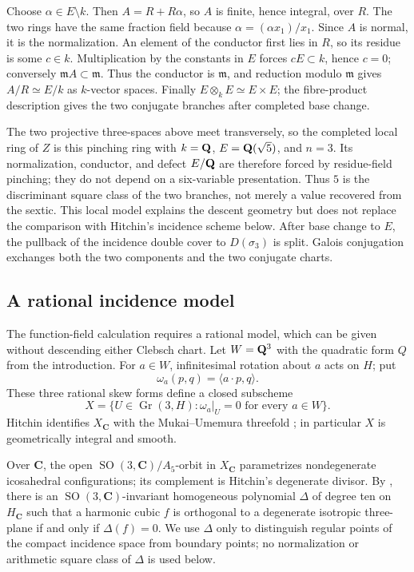 Choose \(\alpha\in E\setminus k\).  Then \(A=R+R\alpha\), so \(A\) is
finite, hence integral, over \(R\).  The two rings have the same fraction
field because \(\alpha=(\alpha x_1)/x_1\).  Since \(A\) is normal, it is
the normalization.  An element of the conductor first lies in \(R\), so its
residue is some \(c\in k\).  Multiplication by the constants in \(E\)
forces \(cE\subset k\), hence \(c=0\); conversely
\(\mathfrak m A\subset\mathfrak m\).  Thus the conductor is
\(\mathfrak m\), and reduction modulo \(\mathfrak m\) gives
\(A/R\simeq E/k\) as \(k\)-vector spaces.  Finally
\(E\otimes_kE\simeq E\times E\); the fibre-product description gives the
two conjugate branches after completed base change.

The two projective three-spaces above meet transversely, so the completed
local ring of \(Z\) is this pinching ring with \(k=\mathbf Q\),
\(E=\mathbf Q(\sqrt5)\), and \(n=3\).  Its normalization, conductor,
and defect \(E/\mathbf Q\) are therefore forced by residue-field pinching; they do
not depend on a six-variable presentation.  Thus \(5\) is the discriminant
square class of the two branches, not merely a value recovered from the
sextic.  This local model explains the descent geometry but does not replace
the comparison with Hitchin's incidence scheme below.
After base change to \(E\), the pullback of the incidence double cover to
\(D(\sigma_3)\) is split.  Galois conjugation exchanges both the two
components and the two conjugate charts.

\subsection{A rational incidence model}
\label{sec:rational-incidence-model}

The function-field calculation requires a rational model, which can be
given without descending either Clebsch chart.  Let \(W=\mathbf Q^3\) with the
quadratic form \(Q\) from the introduction.  For \(a\in W\), infinitesimal
rotation about \(a\) acts on \(H\); put
\[
 \omega_a(p,q)=\langle a\mathbin{\cdot}p,q\rangle .
\]
These three rational skew forms define a closed subscheme
\[
 X=\{U\in\operatorname{Gr}(3,H):
       \omega_a|_U=0\text{ for every }a\in W\}.
\]
Hitchin identifies \(X_{\mathbf C}\) with the Mukai--Umemura threefold
\cite[\S\S4--5]{HitchinBundles}; in particular \(X\) is geometrically
integral and smooth.

Over \(\mathbf C\), the open \(\operatorname{SO}(3,\mathbf C)/A_5\)-orbit in
\(X_{\mathbf C}\) parametrizes nondegenerate icosahedral configurations; its
complement is Hitchin's degenerate divisor.  By
\cite[\S6, Proposition~2]{HitchinBundles}, there is an
\(\operatorname{SO}(3,\mathbf C)\)-invariant homogeneous polynomial
\(\Delta\) of degree ten on \(H_{\mathbf C}\) such that a harmonic cubic
\(f\) is orthogonal to a degenerate isotropic three-plane if and only if
\(\Delta(f)=0\).  We use \(\Delta\) only to distinguish regular points of the
compact incidence space from boundary points; no normalization or arithmetic
square class of \(\Delta\) is used below.


